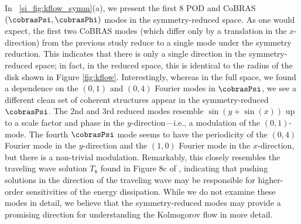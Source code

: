 \documentclass[twocolumn,10pt]{article}
\begin{document}
In \figurename ~\ref{si_fig:kflow_symm}(a), we present the first 8 POD and CoBRAS $(\cobrasPsi, \cobrasPhi)$ modes in the symmetry-reduced space. As one would expect, the first two CoBRAS modes (which differ only by a translation in the $x$-direction) from the previous study reduce to a single mode under the symmetry reduction. This indicates that there is only a single direction in the symmetry-reduced space; in fact, in the reduced space, this is identical to the radius of the disk shown in Figure \ref{fig:kflow}. Interestingly, whereas in the full space, we found a dependence on the $(0,1)$ and $(0,4)$ Fourier modes in $\cobrasPsi$, we see a different clean set of coherent structures appear in the symmetry-reduced $\cobrasPsi$. The 2nd and 3rd reduced modes resemble $\sin(y+\sin(x))$ up to a scale factor and phase in the $y$-direction---i.e., a modulation of the $(0,1)$-mode. The fourth $\cobrasPsi$ mode seems to have the periodicity of the $(0,4)$ Fourier mode in the $y$-direction and the $(1,0)$ Fourier mode in the $x$-direction, but there is a non-trivial modulation. Remarkably, this closely resembles  the traveling wave solution $T_8$ found in Figure 8c of \cite{farazmand2016b}, indicating that pushing solutions in the direction of the traveling wave may be responsible for higher-order sensitivities of the energy dissipation. While we do not examine these modes in detail, we believe that the symmetry-reduced modes may provide a promising direction for understanding the Kolmogorov flow in more detail. 





\clearpage
\end{document}
